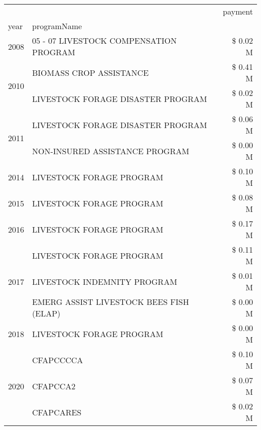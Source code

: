 \begin{tabular}{llr}
\toprule
 &  & payment \\
year & programName &  \\
\midrule
2008 & 05 - 07 LIVESTOCK COMPENSATION PROGRAM & \$ 0.02 M \\
\cline{1-3}
\multirow[t]{2}{*}{2010} & BIOMASS CROP ASSISTANCE & \$ 0.41 M \\
 & LIVESTOCK FORAGE DISASTER  PROGRAM & \$ 0.02 M \\
\cline{1-3}
\multirow[t]{2}{*}{2011} & LIVESTOCK FORAGE DISASTER PROGRAM & \$ 0.06 M \\
 & NON-INSURED ASSISTANCE PROGRAM & \$ 0.00 M \\
\cline{1-3}
2014 & LIVESTOCK FORAGE PROGRAM & \$ 0.10 M \\
\cline{1-3}
2015 & LIVESTOCK FORAGE PROGRAM & \$ 0.08 M \\
\cline{1-3}
2016 & LIVESTOCK FORAGE PROGRAM & \$ 0.17 M \\
\cline{1-3}
\multirow[t]{3}{*}{2017} & LIVESTOCK FORAGE PROGRAM & \$ 0.11 M \\
 & LIVESTOCK INDEMNITY PROGRAM & \$ 0.01 M \\
 & EMERG ASSIST LIVESTOCK BEES FISH (ELAP) & \$ 0.00 M \\
\cline{1-3}
2018 & LIVESTOCK FORAGE PROGRAM & \$ 0.00 M \\
\cline{1-3}
\multirow[t]{3}{*}{2020} & CFAPCCCCA & \$ 0.10 M \\
 & CFAPCCA2 & \$ 0.07 M \\
 & CFAPCARES & \$ 0.02 M \\
\cline{1-3}
\bottomrule
\end{tabular}
